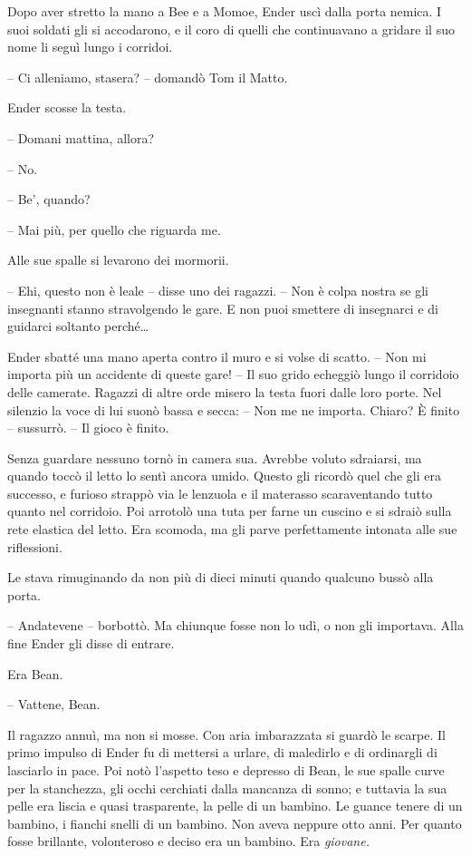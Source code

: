 {Dopo aver stretto la mano a Bee e a Momoe, Ender uscì dalla porta
	nemica. I suoi soldati gli si accodarono, e il coro di quelli che
	continuavano a gridare il suo nome li seguì lungo i corridoi.}

{-- Ci alleniamo, stasera? -- domandò Tom il Matto.}

{Ender scosse la testa.}

{-- Domani mattina, allora?}

{-- No.}

{-- Be', quando?}

{-- Mai più, per quello che riguarda me.}

{Alle sue spalle si levarono dei mormorii.}

{-- Ehi, questo non è leale -- disse uno dei ragazzi. -- Non è colpa
	nostra se gli insegnanti stanno stravolgendo le gare. E non puoi
	smettere di insegnarci e di guidarci soltanto perché\ldots{}}

{Ender sbatté una mano aperta contro il muro e si volse di scatto. --
	Non mi importa più un accidente di queste gare! -- Il suo grido echeggiò
	lungo il corridoio delle camerate. Ragazzi di altre orde misero la testa
	fuori dalle loro porte. Nel silenzio la voce di lui suonò bassa e secca:
	-- Non me ne importa. Chiaro? È finito -- sussurrò. -- Il gioco è
	finito.}

{Senza guardare nessuno tornò in camera sua. Avrebbe voluto sdraiarsi,
	ma quando toccò il letto lo sentì ancora umido. Questo gli ricordò quel
	che gli era successo, e furioso strappò via le lenzuola e il materasso
	scaraventando tutto quanto nel corridoio. Poi arrotolò una tuta per
	farne un cuscino e si sdraiò sulla rete elastica del letto. Era scomoda,
	ma gli parve perfettamente intonata alle sue riflessioni.}

{Le stava rimuginando da non più di dieci minuti quando qualcuno bussò
	alla porta.}

{-- Andatevene -- borbottò. Ma chiunque fosse non lo udì, o non gli
	importava. Alla fine Ender gli disse di entrare.}

{Era Bean.}

{-- Vattene, Bean.}

{Il ragazzo annuì, ma non si mosse. Con aria imbarazzata si guardò le
	scarpe. Il primo impulso di Ender fu di mettersi a urlare, di maledirlo
	e di ordinargli di lasciarlo in pace. Poi notò l'aspetto teso e depresso
	di Bean, le sue spalle curve per la stanchezza, gli occhi cerchiati
	dalla mancanza di sonno; e tuttavia la sua pelle era liscia e quasi
	trasparente, la pelle di un bambino. Le guance tenere di un bambino, i
	fianchi snelli di un bambino. Non aveva neppure otto anni. Per quanto
	fosse brillante, volonteroso e deciso era un bambino. Era
	\emph{giovane.}}

